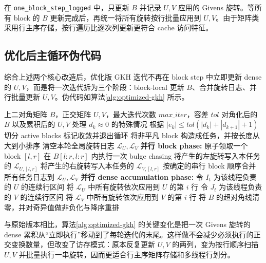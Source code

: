 ﻿\documentclass[UTF8,a4paper]{ctexart}
\begin{document}
在 \texttt{one\_block\_step\_logged} 中，只更新 $B$ 并记录 $U,V$ 应用的 Givens 旋转。等所有 block 的 $B$ 更新完成后，再统一将所有旋转按行批量应用到 $U,V$。由于矩阵类采用行主序存储，按行遍历比逐次列更新更符合 cache 访问特征。

\subsection{优化后主循环伪代码}

综合上述两个核心改造后，优化版 GKH 迭代不再在 block step 中立即更新 dense 的 $U,V$，而是将一次迭代拆为三个阶段：block-local 更新 $B$、合并旋转日志、并行批量更新 $U,V$。伪代码如算法\ref{alg:optimized-gkh} 所示。

\begin{algorithm}[H]
\caption{优化后的 GKH 迭代框架}
\label{alg:optimized-gkh}
\begin{algorithmic}[1]
\Require 上二对角矩阵 $B$，正交矩阵 $U,V$，最大迭代次数 $max\_iter$，容差 $tol$
\Ensure 对角化后的 $B$ 以及累积后的 $U,V$
  \State 处理 $d_k\approx 0$ 的特殊情况
  \State 根据 $|e_k| \le tol(|d_k|+|d_{k+1}|+1)$ 切分 active blocks
    \State 标记收敛并退出循环
  \EndIf
  \State 将非平凡 block 构造成任务，并按长度从大到小排序
  \State 清空本轮全局旋转日志 $\mathcal{L}_U,\mathcal{L}_V$
  \Statex
  \State \textbf{并行 block phase:}
      \State 原子领取一个 block $[l,r]$
      \State 在 $B[l:r,l:r]$ 内执行一次 bulge chasing
      \State 将产生的左旋转写入本任务的 $\mathcal{L}_{U,[l,r]}$
      \State 将产生的右旋转写入本任务的 $\mathcal{L}_{V,[l,r]}$
    \EndWhile
  \EndFor
  \Statex
  \State 按确定的串行 block 顺序合并所有任务日志到 $\mathcal{L}_U,\mathcal{L}_V$
  \Statex
  \State \textbf{并行 dense accumulation phase:}
    \State 令 $I_t$ 为该线程负责的 $U$ 的连续行区间
      \State 将 $\mathcal{L}_U$ 中所有旋转依次应用到 $U$ 的第 $i$ 行
    \EndFor
  \EndFor
    \State 令 $J_t$ 为该线程负责的 $V$ 的连续行区间
      \State 将 $\mathcal{L}_V$ 中所有旋转依次应用到 $V$ 的第 $i$ 行
    \EndFor
  \EndFor
\EndFor
\State 将 $B$ 的超对角线清零，并对奇异值做非负化与降序重排
\end{algorithmic}
\end{algorithm}

与原始版本相比，算法\ref{alg:optimized-gkh} 的关键变化是把一次 Givens 旋转的 dense 累积从“立即执行”移动到了每轮迭代的末尾。这样做不会减少必须执行的正交变换数量，但改变了访存模式：原本反复更新 $U,V$ 的两列，变为按行顺序扫描 $U,V$ 并批量执行一串旋转，因而更适合行主序矩阵存储和多线程行划分。
\end{document}
